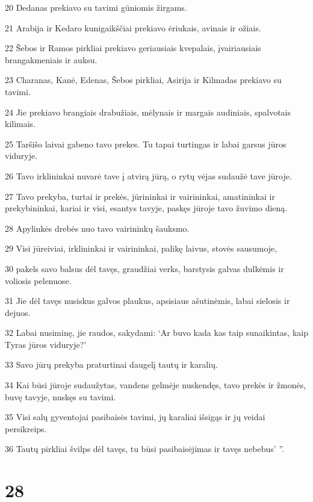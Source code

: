 \par 20 Dedanas prekiavo su tavimi gūniomis žirgams. 
\par 21 Arabija ir Kedaro kunigaikščiai prekiavo ėriukais, avinais ir ožiais. 
\par 22 Šebos ir Ramos pirkliai prekiavo geriausiais kvepalais, įvairiausiais brangakmeniais ir auksu. 
\par 23 Charanas, Kanė, Edenas, Šebos pirkliai, Asirija ir Kilmadas prekiavo su tavimi. 
\par 24 Jie prekiavo brangiais drabužiais, mėlynais ir margais audiniais, spalvotais kilimais. 
\par 25 Taršišo laivai gabeno tavo prekes. Tu tapai turtingas ir labai garsus jūros viduryje. 
\par 26 Tavo irklininkai nuvarė tave į atvirą jūrą, o rytų vėjas sudaužė tave jūroje. 
\par 27 Tavo prekyba, turtai ir prekės, jūrininkai ir vairininkai, amatininkai ir prekybininkai, kariai ir visi, esantys tavyje, paskęs jūroje tavo žuvimo dieną. 
\par 28 Apylinkės drebės nuo tavo vairininkų šauksmo. 
\par 29 Visi jūreiviai, irklininkai ir vairininkai, palikę laivus, stovės sausumoje, 
\par 30 pakels savo balsus dėl tavęs, graudžiai verks, barstysis galvas dulkėmis ir voliosis pelenuose. 
\par 31 Jie dėl tavęs nusiskus galvos plaukus, apsisiaus ašutinėmis, labai sielosis ir dejuos. 
\par 32 Labai nusiminę, jie raudos, sakydami: ‘Ar buvo kada kas taip sunaikintas, kaip Tyras jūros viduryje?’ 
\par 33 Savo jūrų prekyba praturtinai daugelį tautų ir karalių. 
\par 34 Kai būsi jūroje sudaužytas, vandens gelmėje nuskendęs, tavo prekės ir žmonės, buvę tavyje, nuskęs su tavimi. 
\par 35 Visi salų gyventojai pasibaisės tavimi, jų karaliai išsigąs ir jų veidai persikreips. 
\par 36 Tautų pirkliai švilps dėl tavęs, tu būsi pasibaisėjimas ir tavęs nebebus’ ”.



\chapter{28}


